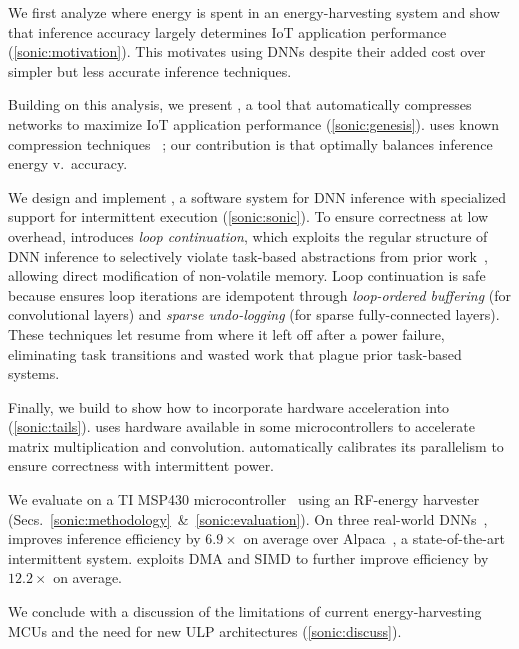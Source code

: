 \begin{compactitem}
\item We first analyze where energy is spent in an energy-harvesting system
and show that inference accuracy largely determines IoT
application performance (\autoref{sonic:motivation}).
%
This motivates using DNNs despite their added cost over simpler but
less accurate inference techniques.
%
\item Building on this analysis, we present \genesis, a tool that
automatically compresses networks to maximize IoT application
performance (\autoref{sonic:genesis}).
%
\genesis uses known compression techniques%
~\cite{nabhan1994toward, han:iclr16:deep-compression,
  chollet2016xception, bhattacharya2016sparsification};
%
our contribution is that \genesis optimally balances inference energy
v.\ accuracy. %
%
\item We design and implement \sonic, 
  a software system for DNN inference with specialized support for intermittent execution
  (\autoref{sonic:sonic}).
  To ensure correctness at low overhead,
  \sonic introduces \emph{loop continuation},
  which exploits the regular structure of DNN inference
  to selectively violate task-based abstractions from prior work~\cite{alpaca},
  allowing direct modification of non-volatile memory.
%
  Loop continuation is safe because
  \sonic ensures loop iterations are idempotent
  through \emph{loop-ordered buffering} (for convolutional layers) and \emph{sparse undo-logging} (for sparse fully-connected layers).
%
These techniques let \sonic resume from where it left off after a power failure,
{eliminating task transitions and wasted work} that plague prior task-based systems.
%
\item Finally, we build \tails to show how to incorporate hardware
  acceleration into \sonic (\autoref{sonic:tails}). \tails uses
  hardware available in some microcontrollers to accelerate matrix
  multiplication and convolution.
  \tails automatically calibrates its parallelism
  to ensure correctness with intermittent power.

\end{compactitem}

\noindent
We evaluate \sonictails on a TI MSP430
microcontroller~\cite{msp430fr5994} using an RF-energy
harvester~\cite{powercastboard,powercasttransmitter} (Secs.~\autoref{sonic:methodology}~\&~\autoref{sonic:evaluation}).
%
On three real-world DNNs~\cite{lecun:ieee89:lenet,okgoogle,har},
\sonic improves inference efficiency by $6.9\times$ on average
over Alpaca~\cite{alpaca}, a state-of-the-art intermittent system.
%
\tails exploits DMA and SIMD to further improve efficiency by $12.2\times$ on average.

We conclude with a discussion of the limitations of current energy-harvesting MCUs and the need for new ULP architectures (\autoref{sonic:discuss}).


